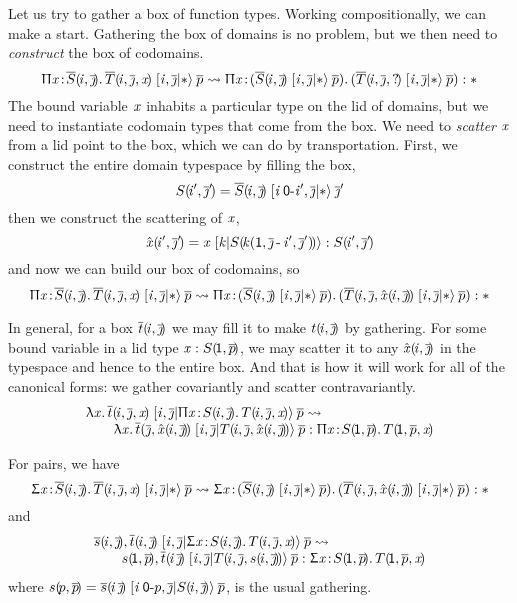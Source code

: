 \documentclass{article}
\begin{document}
Let us try to gather a box of function types. Working compositionally, we can make a
start. Gathering the box of domains is no problem, but we then need to \emph{construct}
the box of codomains.
\[
\xp{\vi,\jj}{\TY}{\PI\vx{\myv S\sv{\vi,\jj}}\myv T\sv{\vi,\jj,\vx}}\:\myv p \leadsto
  \PI\vx{(\xp{\vi,\jj}{\TY}{\myv S\sv{\vi,\jj}}\:\myv p)}
         (\xp{\vi,\jj}{\TY}{\myv T\sv{\vi,\jj,?}}\:\myv p) : \TY
\]
The bound variable $\vx$ inhabits a particular type on the lid of domains,
but we need to instantiate codomain types that come from the box. We need
to \emph{scatter} $\vx$ from a lid point to the box, which we can do by
transportation. First, we construct the entire domain typespace by filling
the box,
\[
S\sv{\vi',\jj'} = \xp{\vi\:\ra\pze\vi',\jj}{\TY}{\myv S\sv{\vi,\jj}}\:\jj'
\]
then we construct the scattering of $\vx$,
\[
\hat\vx\sv{\vi',\jj'} = \xp{\vk}{S\sv{\mux{\vk}{\pun,\jj\,}{\,\vi',\jj'}}}{\vx}
  : S\sv{\vi',\jj'}
\]
and now we can build our box of codomains, so
\[
\xp{\vi,\jj}{\TY}{\PI\vx{\myv S\sv{\vi,\jj}}\myv T\sv{\vi,\jj,\vx}}\:\myv p \leadsto
  \PI\vx{(\xp{\vi,\jj}{\TY}{\myv S\sv{\vi,\jj}}\:\myv p)}
         (\xp{\vi,\jj}{\TY}{\myv T\sv{\vi,\jj,\hat\vx\sv{\vi,\jj}}}\:\myv p) : \TY
\]

In general, for a box $\myv t\sv{\vi,\jj}$ we may
fill it to make $t\sv{\vi,\jj}$ by gathering. For some bound variable in a lid type
$\vx:S\sv{\pun,\myv p}$, we may scatter it to any $\hat\vx\sv{\vi,\jj}$ in the typespace
and hence to the entire box.
And that is how it will work for all of the canonical forms: we gather covariantly and scatter contravariantly.
\[\begin{array}{l}
\xp{\vi,\jj}{\PI\vx{S\sv{\vi,\jj}}T\sv{\vi,\jj,\vx}}{\la\vx\myv t\sv{\vi,\jj,\vx}}\:\myv p
 \leadsto \\ \qquad
  \la\vx \xp{\vi,\jj}{T\sv{\vi,\jj,\hat\vx\sv{\vi,\jj}}}
           {\myv t\sv{\,\jj,\hat\vx\sv{\vi,\jj}}}\:\myv p :
  \PI\vx{S\sv{\pun,\myv p}}T\sv{\pun,\myv p,\vx}
\end{array}\]

For pairs, we have
\[
\xp{\vi,\jj}{\TY}{\SG\vx{\myv S\sv{\vi,\jj}}\myv T\sv{\vi,\jj,\vx}}\:\myv p \leadsto
  \SG\vx{(\xp{\vi,\jj}{\TY}{\myv S\sv{\vi,\jj}}\:\myv p)}
         (\xp{\vi,\jj}{\TY}{\myv T\sv{\vi,\jj,\hat\vx\sv{\vi,\jj}}}\:\myv p) : \TY
\]
and
\[\begin{array}{l}
\xp{\vi,\jj}{\SG\vx{S\sv{\vi,\jj}}T\sv{\vi,\jj,\vx}}{\pa{\myv s\sv{\vi,\jj}}{\myv t\sv{\vi,\jj}}}\:\myv p
 \leadsto \\ \qquad
  \pa{s\sv{\pun,\myv p}}
  {\xp{\vi,\jj}{T\sv{\vi,\jj,s\sv{\vi,\jj}}}
           {\myv t\sv{\vi\,\jj}}\:\myv p} :
  \SG\vx{S\sv{\pun,\myv p}}T\sv{\pun,\myv p,\vx}
\end{array}\]
where $s\sv{p,\myv p} = \xp{\vi\:\ra\pze p,\jj}{S\sv{\vi,\jj}}
           {\myv s\sv{\vi\,\jj}}\:\myv p$, is the usual gathering.
\end{document}
